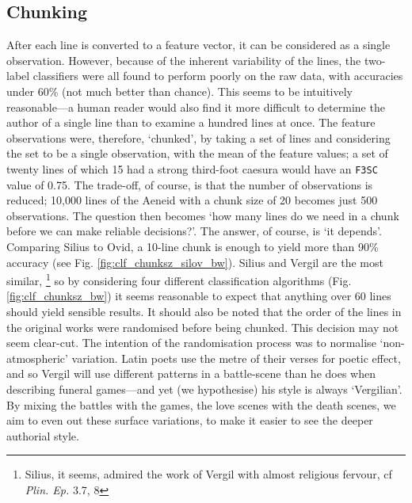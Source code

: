 \documentclass[11pt,a4paper]{scrartcl} %
\begin{document}
{\subsection{Chunking}

After each line is converted to a feature vector, it can be considered as a single observation. However, because of the inherent variability of the lines, the two-label classifiers were all found to perform poorly on the raw data, with accuracies under 60\% (not much better than chance). This seems to be intuitively reasonable---a human reader would also find it more difficult to determine the author of a single line than to examine a hundred lines at once. The feature observations were, therefore, `chunked', by taking a set of lines and considering the set to be a single observation, with the mean of the feature values; a set of twenty lines of which 15 had a strong third-foot caesura would have an \texttt{F3SC} value of 0.75. The trade-off, of course, is that the number of observations is reduced; 10,000 lines of the Aeneid with a chunk size of 20 becomes just 500 observations. The question then becomes `how many lines do we need in a chunk before we can make reliable decisions?'. The answer, of course, is `it depends'. Comparing Silius to Ovid, a 10-line chunk is enough to yield more than 90\% accuracy (see Fig. \ref{fig:clf_chunksz_silov_bw}). Silius and Vergil are the most similar,%
\footnote{Silius, it seems, admired the work of Vergil with almost religious fervour, cf \textit{Plin. Ep.} 3.7, 8}
so by considering four different classification algorithms (Fig. \ref{fig:clf_chunksz_bw}) it seems reasonable to expect that anything over 60 lines should yield sensible results. It should also be noted that the order of the lines in the original works were randomised before being chunked. This decision may not seem clear-cut. The intention of the randomisation process was to normalise `non-atmospheric' variation. Latin poets use the metre of their verses for poetic effect, and so Vergil will use different patterns in a battle-scene than he does when describing funeral games---and yet (we hypothesise) his style is always `Vergilian'. By mixing the battles with the games, the love scenes with the death scenes, we aim to even out these surface variations, to make it easier to see the deeper authorial style.

}
\end{document}
